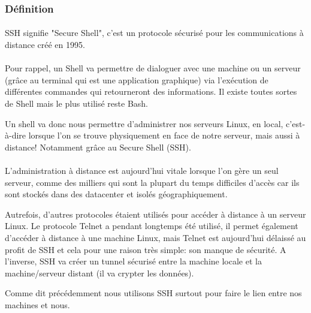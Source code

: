 \subsubsection{Définition}

\paragraph{} SSH signifie "Secure Shell", c'est un protocole sécurisé pour les
communications à distance créé en 1995.

\paragraph{} Pour rappel, un Shell va permettre de dialoguer avec une machine
ou un serveur (grâce au terminal qui est une application graphique) via
l'exécution de différentes commandes qui retourneront des informations. Il
existe toutes sortes de Shell mais le plus utilisé reste Bash.

Un shell va donc nous permettre d'administrer nos serveurs Linux,
en local, c'est-à-dire lorsque l'on se trouve physiquement en face de notre
serveur, mais aussi à distance! Notamment grâce au Secure Shell (SSH).

\paragraph{} L'administration à distance est aujourd'hui vitale lorsque l'on
gère un seul serveur, comme des milliers qui sont la plupart du temps
difficiles d'accès car ils sont stockés dans des datacenter et isolés
géographiquement.

Autrefois, d'autres protocoles étaient utilisés pour accéder à distance à un
serveur Linux. Le protocole Telnet a pendant longtemps été utilisé, il permet
également d'accéder à distance à une machine Linux, mais Telnet est aujourd'hui
délaissé au profit de SSH et cela pour une raison très simple: son manque de
sécurité. A l'inverse, SSH va créer un tunnel sécurisé entre la machine locale
et la machine/serveur distant (il va crypter les données).

Comme dit précédemment nous utilisons SSH surtout pour faire le lien entre nos
machines et nous.

